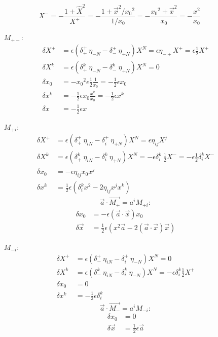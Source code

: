 $$X^- = -\frac{1+\hat{X}^2}{X^+} = -\frac{1+\vec{x}^2/{x_0}^2}{1/x_0} = -\frac{{x_0}^2 + \vec{x}^2}{x_0} = -\frac{x^2}{x_0}$$

\begin{itemize}
\item[$M_{+-}$:]
	\begin{align*}
	\delta X^+ &= \epsilon(\delta^+_+\:\eta_{-N} - \delta^+_-\:\eta_{+N}) X^N = \epsilon \eta_{-+} X^+ = \epsilon \frac12 X^+ \\
	\delta X^k &= \epsilon(\delta^k_+\:\eta_{-N} - \delta^k_-\:\eta_{+N}) X^N = 0 \\
	\delta x_0 &= -{x_0}^2 \epsilon \frac12 \frac{1}{x_0} = -\frac12 \epsilon x_0 \\
	\delta x^k &= -\frac12 \epsilon x_0 \frac{x^k}{x_0} = -\frac12 \epsilon x^k \\
	\delta x &= -\frac12 \epsilon x
	\end{align*}
\item[$M_{+i}$:]
	\begin{align*}
	\delta X^+ &= \epsilon(\delta^+_+\:\eta_{iN} - \delta^+_i\:\eta_{+N}) X^N = \epsilon \eta_{ij} X^j\\
	\delta X^k &= \epsilon(\delta^k_+\:\eta_{iN} - \delta^k_i\:\eta_{+N}) X^N = -\epsilon \delta^k_i\:\frac12 X^- = -\epsilon \frac12 \delta^k_i X^-\\
	\delta x_0 &= -\epsilon \eta_{ij} x_0 x^j \\
	\delta x^k &= \frac12 \epsilon \left(\delta^k_i x^2 - 2\eta_{ij} x^j x^k \right)
	\end{align*}
$$\vec{a}\cdot\vec{M_+} = a^i M_{+i}:$$
\begin{align*}
	\delta x_0 &= -\epsilon (\vec{a}\cdot\vec{x})x_0 \\
	\delta\vec{x} &= \frac12\epsilon \left(x^2 \vec{a} - 2(\vec{a}\cdot\vec{x})\vec{x} \right)
\end{align*}

\item[$M_{-i}$:]
	\begin{align*}
	\delta X^+ &= \epsilon(\delta^+_-\:\eta_{iN} - \delta^+_i\:\eta_{-N}) X^N = 0 \\
	\delta X^k &= \epsilon(\delta^k_-\:\eta_{iN} - \delta^k_i\:\eta_{-N}) X^N = -\epsilon \delta^k_i \frac12 X^+ \\
	\delta x_0 &= 0 \\
	\delta x^k &= -\frac12 \epsilon \delta^k_i
	\end{align*}
$$\vec{a}\cdot\vec{M_-} = a^i M_{-i}:$$
\begin{align*}
	\delta x_0 &= 0 \\
	\delta \vec{x} &= \frac12\epsilon \vec{a}
\end{align*}


\end{itemize}
